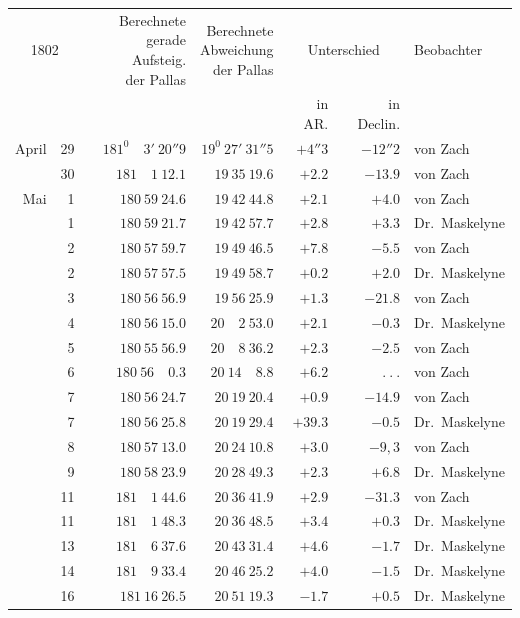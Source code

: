 \begin{center}
{\small\setlength{\tabcolsep}{4pt}
\begin{tabular}{r r|r|r|r|r|l}
\multicolumn{2}{c|}{1802}&\shortstack{Berechnete\\gerade Aufsteig.\\der Pallas}&\shortstack{Berechnete\\Abweichung\\der Pallas}&\multicolumn{2}{c|}{Unterschied}&Beobachter\\
\multicolumn{2}{c|}{}&&&in AR.&in Declin.&\\\hline
April&29&$181^0\quad3'\ 20''9$&$19^0\ 27'\ 31''5$&$+4''3$&$-12''2$&von Zach\\
&30&$181\quad1\ 12.1$&$19\ 35\ 19.6$&$+2.2$&$-13.9$&von Zach\\
Mai&1&$180\ 59\ 24.6$&$19\ 42\ 44.8$&$+2.1$&$+4.0$&von Zach\\
&1&$180\ 59\ 21.7$&$19\ 42\ 57.7$&$+2.8$&$+3.3$&Dr.\ Maskelyne\\
&2&$180\ 57\ 59.7$&$19\ 49\ 46.5$&$+7.8$&$-5.5$&von Zach\\
&2&$180\ 57\ 57.5$&$19\ 49\ 58.7$&$+0.2$&$+2.0$&Dr.\ Maskelyne\\
&3&$180\ 56\ 56.9$&$19\ 56\ 25.9$&$+1.3$&$-21.8$&von Zach\\
&4&$180\ 56\ 15.0$&$20\quad2\ 53.0$&$+2.1$&$-0.3$&Dr.\ Maskelyne\\
&5&$180\ 55\ 56.9$&$20\quad8\ 36.2$&$+2.3$&$-2.5$&von Zach\\
&6&$180\ 56\quad0.3$&$20\ 14\quad8.8$&$+6.2$&$\ .\ .\ .$&von Zach\\
&7&$180\ 56\ 24.7$&$20\ 19\ 20.4$&$+0.9$&$-14.9$&von Zach\\
&7&$180\ 56\ 25.8$&$20\ 19\ 29.4$&$+39.3$&$-0.5$&Dr.\ Maskelyne\\
&8&$180\ 57\ 13.0$&$20\ 24\ 10.8$&$+3.0$&$-9{,}3$&von Zach\\
&9&$180\ 58\ 23.9$&$20\ 28\ 49.3$&$+2.3$&$+6.8$&Dr.\ Maskelyne\\
&11&$181\quad1\ 44.6$&$20\ 36\ 41.9$&$+2.9$&$-31.3$&von Zach\\
&11&$181\quad1\ 48.3$&$20\ 36\ 48.5$&$+3.4$&$+0.3$&Dr.\ Maskelyne\\
&13&$181\quad6\ 37.6$&$20\ 43\ 31.4$&$+4.6$&$-1.7$&Dr.\ Maskelyne\\
&14&$181\quad9\ 33.4$&$20\ 46\ 25.2$&$+4.0$&$-1.5$&Dr.\ Maskelyne\\
&16&$181\ 16\ 26.5$&$20\ 51\ 19.3$&$-1.7$&$+0.5$&Dr.\ Maskelyne
\end{tabular}}
\end{center}

